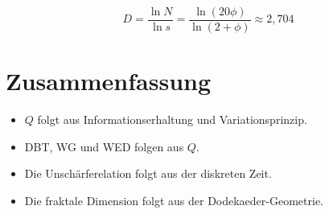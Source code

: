 \[
D = \frac{\ln N}{\ln s} = \frac{\ln(20\phi)}{\ln(2 + \phi)} \approx 2,704
\]

\section{Zusammenfassung}

\begin{itemize}
\item \( Q \) folgt aus Informationserhaltung und Variationsprinzip.
\item DBT, WG und WED folgen aus \( Q \).
\item Die Unschärferelation folgt aus der diskreten Zeit.
\item Die fraktale Dimension folgt aus der Dodekaeder-Geometrie.
\end{itemize}